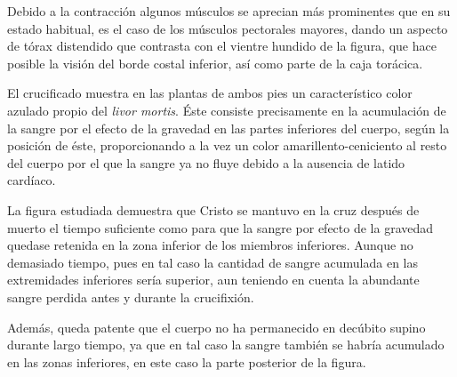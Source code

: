 Debido a la contracción algunos músculos se aprecian más prominentes que en su estado habitual, es el caso de los músculos pectorales mayores, dando un aspecto de tórax distendido que contrasta con el vientre hundido de la figura, que hace posible la visión del borde costal inferior, así como parte de la caja torácica.

El crucificado muestra en las plantas de ambos pies un característico color azulado propio del \textit{livor mortis}. Éste consiste precisamente en la acumulación de la sangre por el efecto de la gravedad en las partes inferiores del cuerpo, según la posición de éste, proporcionando a la vez un color amarillento-ceniciento al resto del cuerpo por el que la sangre ya no fluye debido a la ausencia de latido cardíaco.

La figura estudiada demuestra que Cristo se mantuvo en la cruz después de muerto el tiempo suficiente como para que la sangre por efecto de la gravedad quedase retenida en la zona inferior de los miembros inferiores. Aunque no demasiado tiempo, pues en tal caso la cantidad de sangre acumulada en las extremidades inferiores sería superior, aun teniendo en cuenta la abundante sangre perdida antes y durante la crucifixión.

Además, queda patente que el cuerpo no ha permanecido en decúbito supino durante largo tiempo, ya que en tal caso la sangre también se habría acumulado en las zonas inferiores, en este caso la parte posterior de la figura.